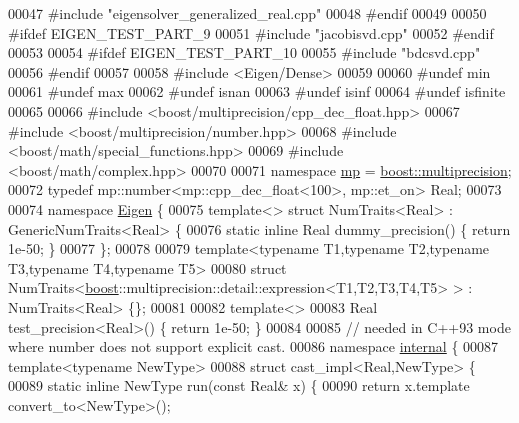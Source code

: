 \begin{DoxyCode}
00047 \textcolor{preprocessor}{#include "eigensolver\_generalized\_real.cpp"}
00048 \textcolor{preprocessor}{#endif}
00049 
00050 \textcolor{preprocessor}{#ifdef EIGEN\_TEST\_PART\_9}
00051 \textcolor{preprocessor}{#include "jacobisvd.cpp"}
00052 \textcolor{preprocessor}{#endif}
00053 
00054 \textcolor{preprocessor}{#ifdef EIGEN\_TEST\_PART\_10}
00055 \textcolor{preprocessor}{#include "bdcsvd.cpp"}
00056 \textcolor{preprocessor}{#endif}
00057 
00058 \textcolor{preprocessor}{#include <Eigen/Dense>}
00059 
00060 \textcolor{preprocessor}{#undef min}
00061 \textcolor{preprocessor}{#undef max}
00062 \textcolor{preprocessor}{#undef isnan}
00063 \textcolor{preprocessor}{#undef isinf}
00064 \textcolor{preprocessor}{#undef isfinite}
00065 
00066 \textcolor{preprocessor}{#include <boost/multiprecision/cpp\_dec\_float.hpp>}
00067 \textcolor{preprocessor}{#include <boost/multiprecision/number.hpp>}
00068 \textcolor{preprocessor}{#include <boost/math/special\_functions.hpp>}
00069 \textcolor{preprocessor}{#include <boost/math/complex.hpp>}
00070 
00071 \textcolor{keyword}{namespace }\hyperlink{namespaceboost_1_1multiprecision}{mp} = \hyperlink{namespaceboost_1_1multiprecision}{boost::multiprecision};
00072 \textcolor{keyword}{typedef} mp::number<mp::cpp\_dec\_float<100>, mp::et\_on> Real;
00073 
00074 \textcolor{keyword}{namespace }\hyperlink{namespace_eigen}{Eigen} \{
00075   \textcolor{keyword}{template}<> \textcolor{keyword}{struct }NumTraits<Real> : GenericNumTraits<Real> \{
00076     \textcolor{keyword}{static} \textcolor{keyword}{inline} Real dummy\_precision() \{ \textcolor{keywordflow}{return} 1e-50; \}
00077   \};
00078 
00079   \textcolor{keyword}{template}<\textcolor{keyword}{typename} T1,\textcolor{keyword}{typename} T2,\textcolor{keyword}{typename} T3,\textcolor{keyword}{typename} T4,\textcolor{keyword}{typename} T5>
00080   \textcolor{keyword}{struct }NumTraits<\hyperlink{namespaceboost}{boost}::multiprecision::detail::expression<T1,T2,T3,T4,T5> > : NumTraits<Real> \{\};
00081 
00082   \textcolor{keyword}{template}<>
00083   Real test\_precision<Real>() \{ \textcolor{keywordflow}{return} 1e-50; \}
00084 
00085   \textcolor{comment}{// needed in C++93 mode where number does not support explicit cast.}
00086   \textcolor{keyword}{namespace }\hyperlink{namespaceinternal}{internal} \{
00087     \textcolor{keyword}{template}<\textcolor{keyword}{typename} NewType>
00088     \textcolor{keyword}{struct }cast\_impl<Real,NewType> \{
00089       \textcolor{keyword}{static} \textcolor{keyword}{inline} NewType run(\textcolor{keyword}{const} Real& x) \{
00090         \textcolor{keywordflow}{return} x.template convert\_to<NewType>();

\end{DoxyCode}
